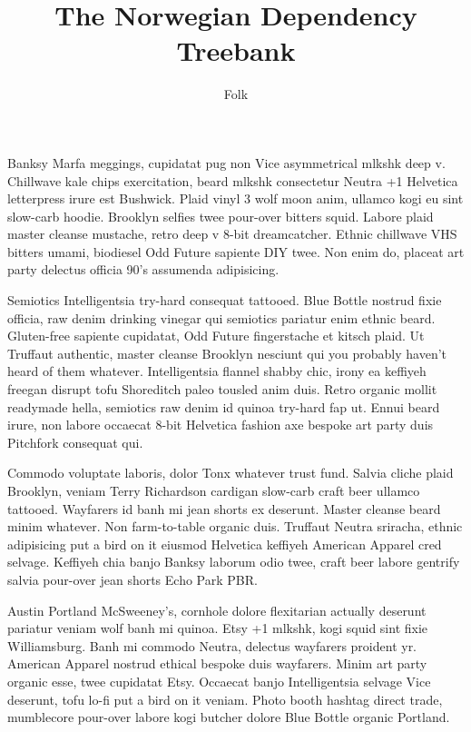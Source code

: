 \documentclass[10pt,a4paper]{article}
\title{The Norwegian Dependency Treebank}
\author{Folk}
\begin{document}
\maketitle

Banksy Marfa meggings, cupidatat pug non Vice asymmetrical mlkshk deep v.
Chillwave kale chips exercitation, beard mlkshk consectetur Neutra +1
Helvetica letterpress irure est Bushwick. Plaid vinyl 3 wolf moon anim,
ullamco kogi eu sint slow-carb hoodie. Brooklyn selfies twee pour-over bitters
squid. Labore plaid master cleanse mustache, retro deep v 8-bit dreamcatcher.
Ethnic chillwave VHS bitters umami, biodiesel Odd Future sapiente DIY twee.
Non enim do, placeat art party delectus officia 90's assumenda adipisicing.

Semiotics Intelligentsia try-hard consequat tattooed. Blue Bottle nostrud
fixie officia, raw denim drinking vinegar qui semiotics pariatur enim ethnic
beard. Gluten-free sapiente cupidatat, Odd Future fingerstache et kitsch
plaid. Ut Truffaut authentic, master cleanse Brooklyn nesciunt qui you
probably haven't heard of them whatever. Intelligentsia flannel shabby chic,
irony ea keffiyeh freegan disrupt tofu Shoreditch paleo tousled anim duis.
Retro organic mollit readymade hella, semiotics raw denim id quinoa try-hard
fap ut. Ennui beard irure, non labore occaecat 8-bit Helvetica fashion axe
bespoke art party duis Pitchfork consequat qui.

Commodo voluptate laboris, dolor Tonx whatever trust fund. Salvia cliche plaid
Brooklyn, veniam Terry Richardson cardigan slow-carb craft beer ullamco
tattooed. Wayfarers id banh mi jean shorts ex deserunt. Master cleanse beard
minim whatever. Non farm-to-table organic duis. Truffaut Neutra sriracha,
ethnic adipisicing put a bird on it eiusmod Helvetica keffiyeh American
Apparel cred selvage. Keffiyeh chia banjo Banksy laborum odio twee, craft beer
labore gentrify salvia pour-over jean shorts Echo Park PBR.

Austin Portland McSweeney's, cornhole dolore flexitarian actually deserunt
pariatur veniam wolf banh mi quinoa. Etsy +1 mlkshk, kogi squid sint fixie
Williamsburg. Banh mi commodo Neutra, delectus wayfarers proident yr. American
Apparel nostrud ethical bespoke duis wayfarers. Minim art party organic esse,
twee cupidatat Etsy. Occaecat banjo Intelligentsia selvage Vice deserunt, tofu
lo-fi put a bird on it veniam. Photo booth hashtag direct trade, mumblecore
pour-over labore kogi butcher dolore Blue Bottle organic Portland.
\end{document}
